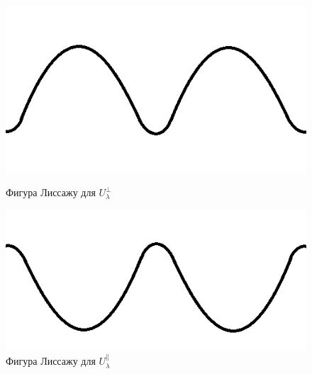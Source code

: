 \documentclass[a4paper, 12pt]{article}%
\begin{document}
\begin{enumerate}
	
	\begin{figure}[H]
		\centering
		\begin{minipage}[b]{0.4\textwidth}
			\includegraphics[width=\textwidth]{perp1.png}
			\caption{Фигура Лиссажу для $U_{\lambda}^{\perp}$}
		\end{minipage}
		\hfill
		\begin{minipage}[b]{0.4\textwidth}
			\includegraphics[width=\textwidth]{parall1.png}
			\caption{Фигура Лиссажу для $U_{\lambda}^{\parallel}$}
		\end{minipage}
	\end{figure}
	

\end{enumerate}
\end{document}
